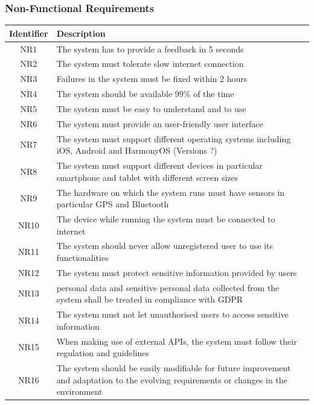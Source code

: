 \documentclass[../main.tex]{subfiles}
\begin{document}
\subsubsection{Non-Functional Requirements}
\begin{center}
\begin{longtable}{| c | p{12cm} | } 
\hline
\textbf{Identifier} & \textbf{Description} \\
\hline

NR1 & The system has to provide a feedback in 5 seconds
\\
\hline
NR2 & The system must tolerate slow internet connection
\\
\hline
NR3 & Failures in the system must be fixed within 2 hours
\\
\hline
NR4 & The system should be available 99\% of the time
\\
\hline
NR5 & The system must be easy to understand and to use
\\
\hline
NR6 & The system must provide an user-friendly user interface
\\
\hline
NR7 & The system must support different operating systems including iOS, Android and HarmonyOS (Versions ?)
\\
\hline
NR8 & The system must support different devices in particular smartphone and tablet with different screen sizes 
\\
\hline
NR9 & The hardware on which the system runs must have sensors in particular GPS and Bluetooth
\\
\hline
NR10 & The device while running the system must be connected to internet
\\
\hline
NR11 & The system should never allow unregistered user to use its functionalities
\\
\hline
NR12 & The system must protect sensitive information provided by users
\\
\hline
NR13 & personal data and sensitive personal data collected from the system shall be treated in compliance with GDPR 
\\
\hline
NR14 & The system must not let unauthorised users to access sensitive information
\\
\hline
NR15 & When making use of external APIs, the system must follow their regulation and guidelines
\\
\hline
NR16 & The system should be easily modifiable for future improvement and adaptation to the evolving requirements or changes in the environment
\\
\hline
\end{longtable}
\end{center}
\end{document}
